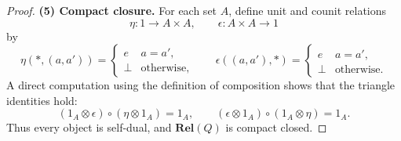 \begin{proof}
	\medskip
	\noindent
	\textbf{(5) Compact closure.}
	For each set $A$, define unit and counit relations
	\[
		\eta : 1 \to A\times A,
		\qquad
		\epsilon : A\times A \to 1
	\]
	by
	\[
		\eta(*,(a,a')) =
		\begin{cases}
			e    & a=a',             \\
			\bot & \text{otherwise},
		\end{cases}
		\qquad
		\epsilon((a,a'),*) =
		\begin{cases}
			e    & a=a',             \\
			\bot & \text{otherwise}.
		\end{cases}
	\]
	A direct computation using the definition of composition shows that the
	triangle identities hold:
	\[
		(1_A\otimes \epsilon)\circ (\eta\otimes 1_A) = 1_A,
		\qquad
		(\epsilon\otimes 1_A)\circ (1_A\otimes \eta) = 1_A.
	\]
	Thus every object is self-dual, and $\mathbf{Rel}(Q)$ is compact closed.
\end{proof}


